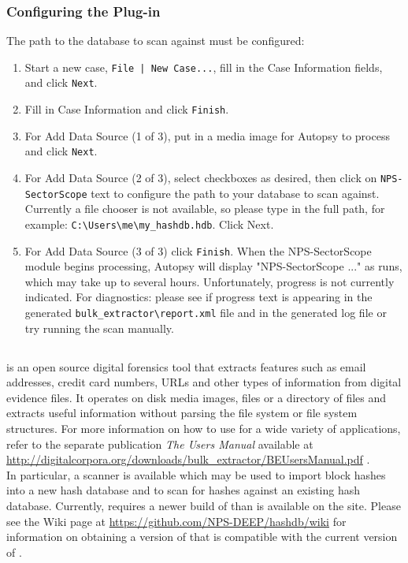 \documentclass[11pt,fleqn]{article} %
\begin{document}
\subsubsection{Configuring the \sscope Plug-in}
The path to the \hdb database to scan against must be configured:

\begin{enumerate}
\item Start a new case, \verb+File | New Case...+, fill in the Case Information fields, and click \verb+Next+.
\item Fill in Case Information and click \verb+Finish+.
\item For Add Data Source (1 of 3), put in a media image for Autopsy to process and click \verb+Next+.
\item For Add Data Source (2 of 3), select checkboxes as desired, then click on \verb+NPS-SectorScope+ text to configure the path to your \hdb database to scan against. Currently a file chooser is not available, so please type in the full path, for example: \verb+C:\Users\me\my_hashdb.hdb+. Click Next.
\item For Add Data Source (3 of 3) click \verb+Finish+. When the NPS-SectorScope module begins processing, Autopsy will display "NPS-SectorScope ..." as \bulk runs, which may take up to several hours. Unfortunately, \bulk progress is not currently indicated. For diagnostics: please see if progress text is appearing in the generated \verb+bulk_extractor\report.xml+ file and in the generated log file or try running the scan manually.
\end{enumerate}

\subsection{\bulk}
\bulk is an open source digital forensics tool that extracts features such as email addresses, credit card numbers, URLs and other types of information from digital evidence files. It operates on disk media images, files or a directory of files and extracts useful information without parsing the file system or file system structures.  For more information on how to use \bulk for a wide variety of applications, refer to the separate publication \textit{The \bulk Users Manual} available at \url{http://digitalcorpora.org/downloads/bulk_extractor/BEUsersManual.pdf} \cite{beusersguide}.\\

In particular, a \hdb \bulk scanner is available which may be used to import block hashes into a new hash database and to scan for hashes against an existing hash database.
Currently, \hdb requires a newer build of \bulk than is available on the \bulk site.
Please see the \hdb Wiki page at \url{https://github.com/NPS-DEEP/hashdb/wiki}
for information on obtaining a version of \bulk that is compatible with the current version of \hdb.\\
\end{document}
